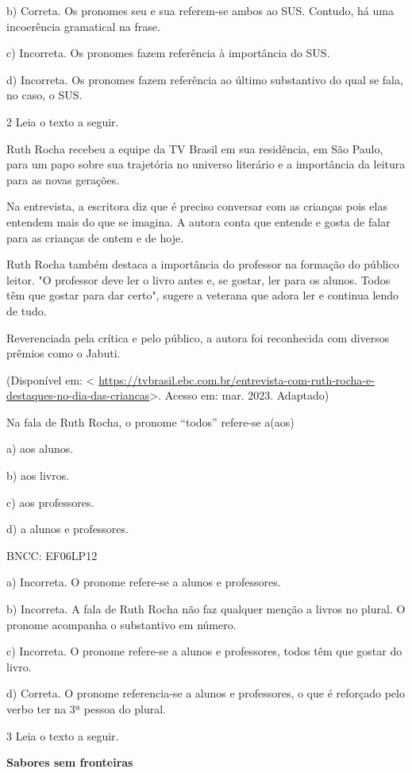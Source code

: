 {b) Correta. Os pronomes seu e sua referem-se ambos ao SUS. Contudo, há
uma incoerência gramatical na frase.

c) Incorreta. Os pronomes fazem referência à importância do SUS.

d) Incorreta. Os pronomes fazem referência ao último substantivo do qual
se fala, no caso, o SUS.

\num{2} Leia o texto a seguir.

Ruth Rocha recebeu a equipe da TV Brasil em sua residência, em São
Paulo, para um papo sobre sua trajetória no universo literário e a
importância da leitura para as novas gerações.

Na entrevista, a escritora diz que é preciso conversar com as crianças
pois elas entendem mais do que se imagina. A autora conta que entende e
gosta de falar para as crianças de ontem e de hoje.

Ruth Rocha também destaca a importância do professor na formação do
público leitor. "O professor deve ler o livro antes e, se gostar, ler
para os alunos. Todos têm que gostar para dar certo", sugere a veterana
que adora ler e continua lendo de tudo.

Reverenciada pela crítica e pelo público, a autora foi reconhecida com
diversos prêmios como o Jabuti.

(Disponível em: \textless{}
\url{https://tvbrasil.ebc.com.br/entrevista-com-ruth-rocha-e-destaques-no-dia-das-criancas}\textgreater.
Acesso em: mar. 2023. Adaptado)

Na fala de Ruth Rocha, o pronome ``todos'' refere-se a(aos)

a) aos alunos.

b) aos livros.

c) aos professores.

d) a alunos e professores.

BNCC: EF06LP12

a) Incorreta. O pronome refere-se a alunos e professores.

b) Incorreta. A fala de Ruth Rocha não faz qualquer menção a livros no
plural. O pronome acompanha o substantivo em número.

c) Incorreta. O pronome refere-se a alunos e professores, todos têm que
gostar do livro.

d) Correta. O pronome referencia-se a alunos e professores, o que é
reforçado pelo verbo ter na 3ª pessoa do plural.

\num{3} Leia o texto a seguir.

\textbf{Sabores sem fronteiras}

}
